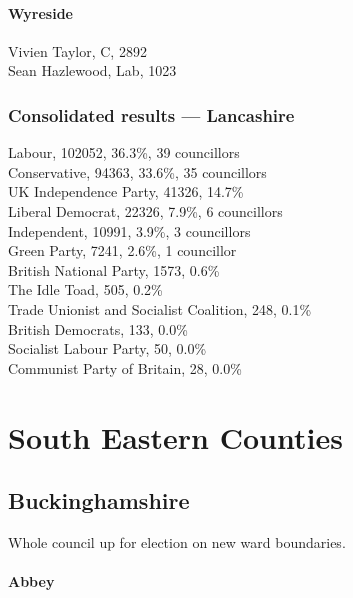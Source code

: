 \documentclass[a4paper,openany,10pt]{book}
\begin{document}
\subsubsection*{Wyreside}



Vivien Taylor, C, 2892\\
Sean Hazlewood, Lab, 1023\\




\subsection*{Consolidated results --- Lancashire}
Labour, 102052, 36.3\%, 39 councillors\\
Conservative, 94363, 33.6\%, 35 councillors\\
UK Independence Party, 41326, 14.7\% \\
Liberal Democrat, 22326, 7.9\%, 6 councillors\\
Independent, 10991, 3.9\%, 3 councillors\\
Green Party, 7241, 2.6\%, 1 councillor\\
British National Party, 1573, 0.6\% \\
The Idle Toad, 505, 0.2\% \\
Trade Unionist and Socialist Coalition, 248, 0.1\% \\
British Democrats, 133, 0.0\% \\
Socialist Labour Party, 50, 0.0\% \\
Communist Party of Britain, 28, 0.0\% \\


\chapter{South Eastern Counties}

\section{Buckinghamshire}

Whole council up for election on new ward boundaries.



\subsubsection*{Abbey}

\end{document}
